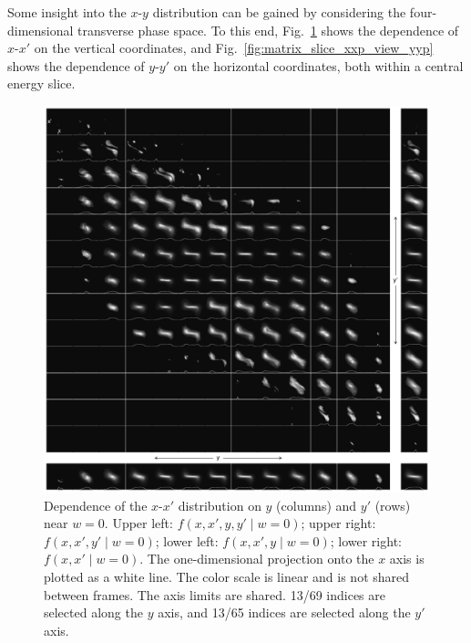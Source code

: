 \documentclass[%
 reprint,
 amsmath,amssymb,
 aps,
prstab,
]{revtex4-2}
\begin{document}
Some insight into the $x$-$y$ distribution can be gained by considering the four-dimensional transverse phase space. To this end, Fig.~\ref{fig:matrix_slice_yyp_view_xxp} shows the dependence of $x$-$x'$ on the vertical coordinates, and Fig.~\ref{fig:matrix_slice_xxp_view_yyp} shows the dependence of $y$-$y'$ on the horizontal coordinates, both within a central energy slice.
%
\begin{figure}[]
    \centering
    \includegraphics[width=\textwidth]{fig_matrix_slice_y-y'_view_x-x'.pdf}
    \caption{Dependence of the $x$-$x'$ distribution on $y$ (columns) and $y'$ (rows) near $w = 0$. Upper left: $f(x, x', y, y' \mid w{=}0)$; upper right: $f(x, x', y' \mid w{=}0)$; lower left: $f(x, x', y \mid w{=}0)$; lower right: $f(x, x' \mid w{=}0)$. The one-dimensional projection onto the $x$ axis is plotted as a white line. The color scale is linear and is not shared between frames. The axis limits are shared. 13/69 indices are selected along the $y$ axis, and 13/65 indices are selected along the $y'$ axis.}
    \label{fig:matrix_slice_yyp_view_xxp}
\end{figure}
%
%
\end{document}

